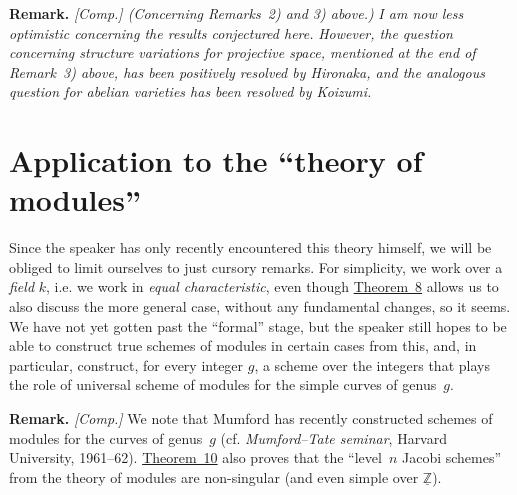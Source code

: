 \documentclass{article}
\newenvironment{rmenv}[1]
  {\phantomsection\par\medskip\noindent\textbf{#1.}\rmfamily}
  {\par\medskip}
\newcommand{\ZZ}{\mathbb{Z}}
\newcommand{\oldpage}[1]{\marginpar{\footnotesize$\Big\vert$ \textit{p.~#1}}}
\begin{document}
\begin{rmenv}{Remark}
  \emph{[Comp.] (Concerning Remarks~2) and 3) above.)}
  \emph{I am now less optimistic concerning the results conjectured here.}
  \emph{However, the question concerning structure variations for projective space, mentioned at the end of Remark~3) above, has been positively resolved by Hironaka, and the analogous question for abelian varieties has been resolved by Koizumi.}
\end{rmenv}


\section{Application to the ``theory of modules''}
\label{section7}

Since the speaker has only recently encountered this theory himself, we will be obliged to limit ourselves to just cursory remarks.
For simplicity, we work over a \emph{field} $k$, i.e. we work in \emph{equal characteristic}, even though \hyperref[theorem8]{Theorem~8} allows us to also discuss the more general case, without any fundamental changes, so it seems.
We have not yet gotten past the ``formal'' stage, but the speaker still hopes to be able to construct true schemes of modules
\oldpage{182-16}
in certain cases from this, and, in particular, construct, for every integer $g$, a scheme over the integers that plays the role of universal scheme of modules for the simple curves of genus~$g$.

\begin{rmenv}{Remark}
  \emph{[Comp.]}
  We note that Mumford has recently constructed schemes of modules for the curves of genus~$g$ (cf. \emph{Mumford--Tate seminar}, Harvard University, 1961--62).
  \hyperref[theorem10]{Theorem~10} also proves that the ``level~$n$ Jacobi schemes'' from the theory of modules are non-singular (and even simple over $\underline{\ZZ}$).
\end{rmenv}
\end{document}
